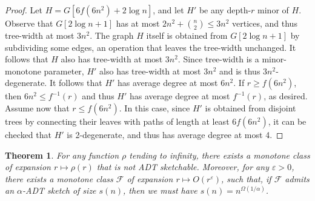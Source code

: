 \documentclass[11pt]{article}
\newtheorem{thm}{Theorem}[section]
\theoremstyle{definition}
\newcommand{\eps}{\varepsilon}
\renewcommand{\le}{\leqslant}
\renewcommand{\ge}{\geqslant}
\def\F {{\mathcal F}}
\begin{document}
\begin{proof}
Let $H=G[6f(6n^2)+2\log n]$, and let $H'$ be any depth-$r$ minor of $H$.  Observe that $G[2\log
n+1]$ has at most $2n^2+{n\choose 2}\le 3n^2$ vertices, and thus tree-width at most $3n^2$. The
graph $H$ itself is obtained from $G[2\log n+1]$ by subdividing some edges, an operation that leaves
the tree-width unchanged. It follows that $H$ also has tree-width at most $3n^2$. Since tree-width
is a minor-monotone parameter, $H'$ also has tree-width at most $3n^2$ and is thus
$3n^2$-degenerate. It follows that $H'$ has average degree at most $6n^2$. If $r\ge f(6n^2)$, then
$6n^2\le f^{-1}(r)$ and thus $H'$ has average degree at most $f^{-1}(r)$, as desired. Assume now
that $r\le f(6n^2)$. In this case, since $H'$ is obtained from disjoint trees by connecting their
leaves with paths of length at least $6 f(6n^2)$, it can be checked that $H'$ is 2-degenerate, and
thus has average degree at most 4. 
\end{proof}

\begin{thm}\label{thm:arbexp}
For any function $\rho$ tending to infinity, there exists a monotone class of expansion $r \mapsto
\rho(r)$ that is not ADT sketchable.  Moreover, for any $\eps>0$, there exists a monotone class
$\F$ of expansion $r\mapsto O(r^\eps)$, such that, if $\F$ admits an $\alpha$-ADT sketch of size
$s(n)$, then we must have $s(n) = n^{\Omega(1/\alpha)}$.
\end{thm}
\end{document}
